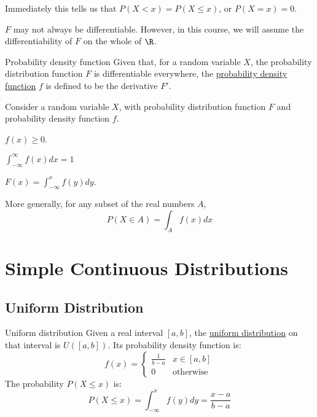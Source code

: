 \documentclass[../Main.tex]{subfiles}
\begin{document}
Immediately this tells us that $P(X < x) = P(X \leq x)$, or $P(X = x) = 0$.\par
$F$ may not always be differentiable. However, in this course, we will assume the differentiability of $F$ on the whole of $\R$.
\begin{definition}{Probability density function}
    Given that, for a random variable $X$, the probability distribution function $F$ is differentiable everywhere, the \underline{probability density function} $f$ is defined to be the derivative $F'$.
\end{definition}
\begin{propositions}{
        Consider a random variable $X$, with probability distribution function $F$ and probability density function $f$.
        \label{propsPdensFuncProps}
    }
    \item $f(x) \geq 0$. \label{propPdensFuncNonNegative}
    \item $\int_{-\infty}^\infty f(x) dx = 1$ \label{propPdensFuncIntegralOne}
    \item $F(x) = \int_{-\infty}^x f(y) dy$. \label{propPdensFuncIntegratePDF}
\end{propositions}
More generally, for any subset of the real numbers $A$,
\begin{equation*}
    P(X \in A) = \int_A f(x) dx
\end{equation*}
\section{Simple Continuous Distributions}
\subsection{Uniform Distribution}
\begin{definition}{Uniform distribution}
    Given a real interval $[a, b]$, the \underline{uniform distribution} on that interval is $U([a, b])$. Its probability density function is: 
    \begin{equation*}
        f(x) =
        \begin{cases}
            \frac{1}{b-a} & x \in [a, b] \\
            0 & \text{otherwise}
        \end{cases}
    \end{equation*}
    The probability $P(X \leq x)$ is:
    \begin{equation*}
        P(X \leq x) = \int_{-\infty}^x f(y) dy = \frac{x - a}{b - a}
    \end{equation*}
\end{definition}
\end{document}
